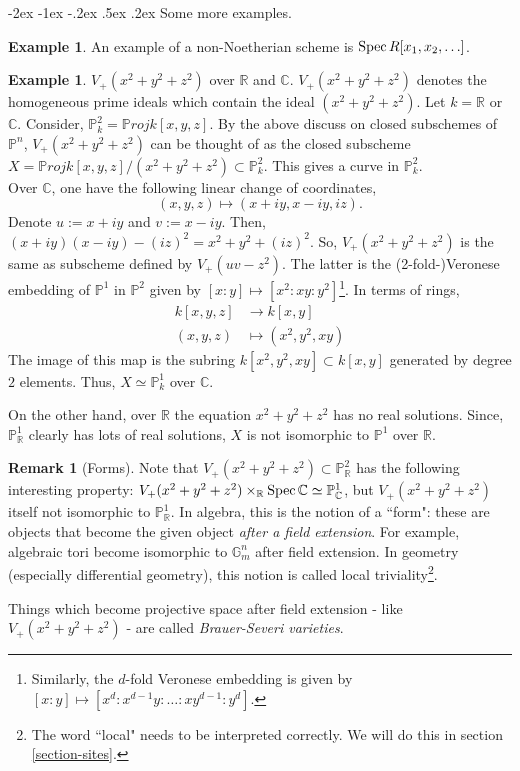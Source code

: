 \documentclass[11pt]{amsart}
\makeatletter
\renewcommand\subsection{\@startsection {subsection}{1}{\z@}%
	{-2ex \@plus -1ex \@minus -.2ex}%
	{.5ex \@plus.2ex}%
	{\normalfont\bfseries}}
\newcommand{\Proj}{{\P roj}}
\newcommand{\Spec}{{\rm Spec \,}}
\newcommand{\C}{{\mathbb C}}
\newcommand{\G}{{\mathbb G}}
\renewcommand{\P}{{\mathbb P}}
\newcommand{\R}{{\mathbb R}}
\theoremstyle{definition}
\newtheorem{example}[theorem]{Example}
\newtheorem{remark}[theorem]{Remark}
\makeatother
\begin{document}
\subsection{Some more examples.}

\begin{example}
An example of a non-Noetherian scheme is $\Spec R[x_1,x_2,\ldots]$. 
\end{example}


\begin{example}\label{example-forms}
$V_{+}(x^2+y^2+z^2)$ over $\R$ and $\C$. $V_{+}(x^2+y^2+z^2)$ denotes the homogeneous prime ideals which contain the ideal $(x^2+y^2+z^2)$. Let $k=\R$ or $\C$. Consider, $\P_k^2=\Proj k[x,y,z]$. By the above discuss on closed subschemes of $\P^n$, $V_{+}(x^2+y^2+z^2)$ can be thought of as the closed subscheme $X=\Proj k[x,y,z]/(x^2+y^2+z^2)\subset \P_k^2$. This gives a curve in $\P_k^2$.\\
Over $\C$, one have the following linear change of coordinates, 
\[(x,y,z)\mapsto (x+iy,x-iy,iz).\] 
Denote $u:=x+iy$ and $v:=x-iy$. Then, $(x+iy) (x-iy) -(iz)^2= x^2+y^2+(iz)^2$. So, $V_{+}(x^2+y^2+z^2)$ is the same as subscheme defined by $V_+(uv-z^2)$. The latter is the (2-fold-)Veronese embedding of $\P^1$ in $\P^2$ given by $[x:y]\mapsto [x^2:xy:y^2]$\footnote{Similarly, the $d$-fold Veronese embedding is given by $[x:y]\mapsto [x^d:x^{d-1}y:\ldots:xy^{d-1}:y^d]$.}. In terms of rings,
\begin{align*}
k[x,y,z]&\rightarrow k[x,y]\\
(x,y,z)&\mapsto (x^2,y^2,xy)
\end{align*}
The image of this map is the subring $k[x^2,y^2,xy]\subset k[x,y]$ generated by degree $2$ elements. Thus, $X\simeq \P_{k}^1$ over $\C$.

On the other hand, over $\R$ the equation $x^2+y^2+z^2$ has no real solutions. Since, $\P_{\R}^1$ clearly has lots of real solutions, $X$ is not isomorphic to $\P^1$ over $\R$.
\end{example}


\begin{remark}[Forms]\label{remark-forms}
	Note that $V_+(x^2+y^2+z^2)\subset \P_{\R}^2$ has the following interesting property: $V_+(x^2+y^2+z^2)\times_{\R}\Spec \C\simeq \P_{\C}^1$, but $V_+(x^2+y^2+z^2)$ itself not isomorphic to $\P_{\R}^1$. In algebra, this is the notion of a ``form": these are objects that become the given object \textit{after a field extension}. For example, algebraic tori become isomorphic to $\G_m^n$ after field extension. In geometry (especially differential geometry), this notion is called local triviality\footnote{The word ``local" needs to be interpreted correctly. We will do this in section \ref{section-sites}.}.
	
	Things which become projective space after field extension - like $V_+(x^2+y^2+z^2)$ - are called  \textit{Brauer-Severi varieties}.
\end{remark}
\end{document}
